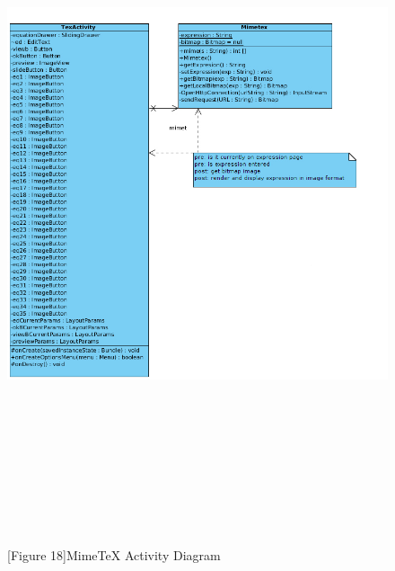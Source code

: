 \documentclass[29pt,a4paper]{moderncv}
\begin{document}
		\begin{figure}
							\centering
							\\ \includegraphics[width=7in, height=7.1in]{./5_MimetexSC.jpg}
							\\\caption{[Figure 18]MimeTeX Activity Diagram} \\
						\end{figure}
		
\end{document}
